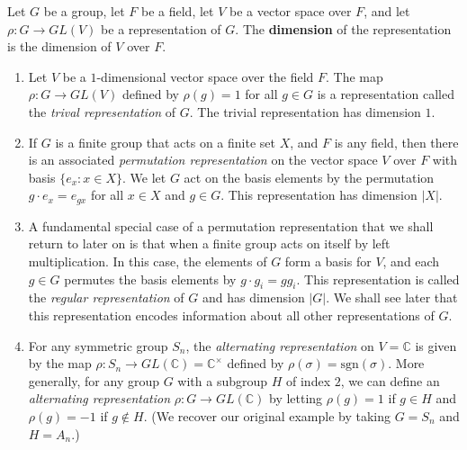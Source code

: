  \begin{defn}Let $G$ be a group, let $F$ be a field, let $V$ be a vector space over $F$, and let $\rho \colon G \to GL(V)$ be a representation of $G$.  The \textbf{dimension} of the representation is the dimension of $V$ over $F$.  
 \end{defn}
 \begin{example}
 \begin{enumerate}
\item Let $V$ be a $1$-dimensional vector space over the field $F$.  The map $\rho \colon G \to GL(V)$ defined by $\rho(g) = 1$ for all $g \in G$ is a representation called the \textit{trival representation} of $G$.  The trivial representation has dimension $1$.

\item If $G$ is a finite group that acts on a finite set $X$, and $F$ is any field, then there is an associated \textit{permutation representation}  on the vector space $V$ over $F$ with basis $\{e_x \colon x \in X\}$.  We let $G$ act on the basis elements by the permutation $g \cdot e_x = e_{gx}$ for all $x \in X$ and $g \in G$. This representation has dimension $|X|$.  

\item A fundamental special case of a permutation representation that we shall return to later on is that when a finite group acts on itself by left multiplication.  In this case, the elements of $G$ form a basis for $V$, and each $g \in G$ permutes the basis elements by $g \cdot g_i = gg_i$.  This representation is called the \textit{regular representation} of $G$ and has dimension $|G|$. We shall see later that this representation encodes information about all other representations of $G$.

\item For any symmetric group $S_n$, the \textit{alternating representation} on $V=\mathbb{C}$ is given by the map $\rho \colon S_n \to GL(\mathbb{C})=\mathbb{C}^\times$ defined by $\rho(\sigma)=\text{sgn}(\sigma)$. More generally, for any group $G$ with a subgroup $H$ of index $2$, we can define an \textit{alternating representation} $\rho \colon G \to GL(\mathbb{C})$ by letting $\rho(g) = 1$ if $g \in H$ and $\rho(g) = -1$ if $g \notin H$.  (We recover our original example  by taking $G= S_n$ and $H=A_n$.)

\end{enumerate}
 \end{example}

